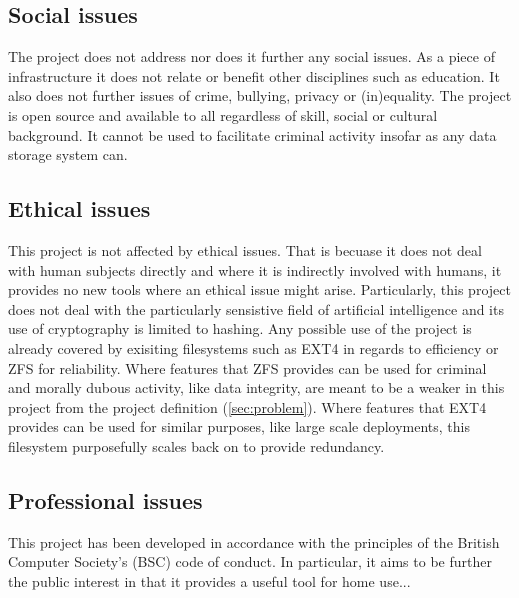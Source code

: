 \begin{appendices}
        \subsection{Social issues}

            The project does not address nor does it further any social issues.
            As a piece of infrastructure it does not relate or benefit other
            disciplines such as education. It also does not further issues of
            crime, bullying, privacy or (in)equality. The project is open
            source and available to all regardless of skill, social or cultural
            background. It cannot be used to facilitate criminal activity
            insofar as any data storage system can.

        \subsection{Ethical issues}

            This project is not affected by ethical issues. That is becuase it
            does not deal with human subjects directly and where it is
            indirectly involved with humans, it provides no new tools where an
            ethical issue might arise. Particularly, this project does not deal
            with the particularly sensistive field of artificial intelligence
            and its use of cryptography is limited to hashing. Any possible use
            of the project is already covered by exisiting filesystems such as
            EXT4 in regards to efficiency or ZFS for reliability. Where
            features that ZFS provides can be used for criminal and morally
            dubous activity, like data integrity, are meant to be a weaker in
            this project from the project definition (\autoref{sec:problem}). Where
            features that EXT4 provides can be used for similar purposes, like
            large scale deployments, this filesystem purposefully scales back
            on to provide redundancy.

        \subsection{Professional issues}

            This project has been developed in accordance with the principles
            of the British Computer Society's (BSC) code of conduct. In
            particular, it aims to be further the public interest in that it
            provides a useful tool for home use...



\end{appendices}
